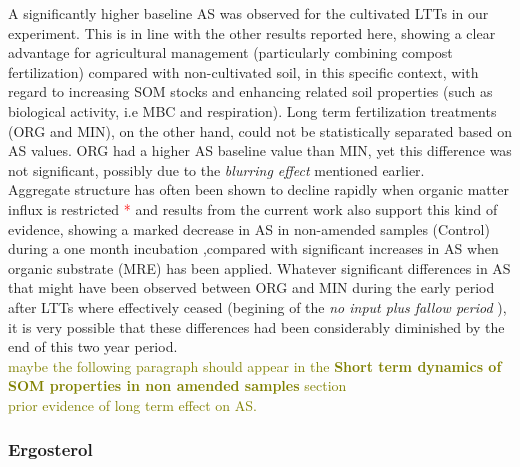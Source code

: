 \documentclass[12pt]{report}
\newcommand{\myRed}[1]{\textcolor{red}{#1}} %
\newcommand{\myGreen}[1]{\textcolor{olive}{#1}} %
\begin{document}
   			A significantly higher baseline AS was observed for the cultivated LTTs in our experiment. This is in line with the other results reported here, showing a clear advantage for agricultural management (particularly combining compost fertilization) compared with non-cultivated soil, in this specific context, with regard to increasing SOM stocks and enhancing related soil properties (such as biological activity, i.e MBC and respiration). Long term fertilization treatments (ORG and MIN), on the other hand, could not be statistically separated based on AS values. ORG had a higher AS baseline value than MIN, yet this difference was not significant, possibly due to the \textit{blurring effect} mentioned earlier. \\
   			Aggregate structure has often been shown to decline rapidly when organic matter influx is restricted \myRed{*} and results from the current work also  support this kind of evidence, showing  a marked decrease in AS in non-amended samples (Control) during a one month incubation ,compared with significant increases in AS when organic substrate (MRE) has been applied.
   			Whatever significant differences in AS that might have been observed between ORG and MIN during the early period after LTTs where  effectively ceased (begining of the \textit{no input plus fallow period} ), it is very possible that these differences had been considerably diminished by the end of this two year  period.\\ 
   			\myGreen{maybe the following paragraph should appear in the \textbf{Short term dynamics of SOM properties in non amended samples} section }\\
   			\myGreen{prior evidence of long term effect on AS.}
			
	\subsubsection{Ergosterol}
		
\end{document}

